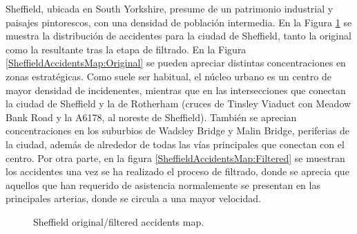 \documentclass{uathesis-es}
\begin{document}
Sheffield, ubicada en South Yorkshire, presume de un patrimonio industrial y paisajes pintorescos, con una densidad de población intermedia. En la Figura \ref{SheffieldAccidentsMap} se muestra la distribución de accidentes para la ciudad de Sheffield, tanto la original como la resultante tras la etapa de filtrado. En la Figura \ref{SheffieldAccidentsMap:Original} se pueden apreciar distintas concentraciones en zonas estratégicas. Como suele ser habitual, el núcleo urbano es un centro de mayor densidad de incidenentes, mientras que en las intersecciones que conectan la ciudad de Sheffield y la de Rotherham (cruces de Tinsley Viaduct con Meadow Bank Road y la A6178, al noreste de Sheffield). También se aprecian concentraciones en los suburbios de Wadsley Bridge y Malin Bridge, periferias de la ciudad, además de alrededor de todas las vías principales que conectan con el centro. Por otra parte, en la figura \ref{SheffieldAccidentsMap:Filtered} se muestran los accidentes una vez se ha realizado el proceso de filtrado, donde se aprecia que aquellos que han requerido de asistencia normalemente se presentan en las principales arterias, donde se circula a una mayor velocidad.

 \begin{figure}[H]
     \centering
     \caption{Sheffield original/filtered accidents map.}
     \label{SheffieldAccidentsMap}
 \end{figure}
\end{document}
